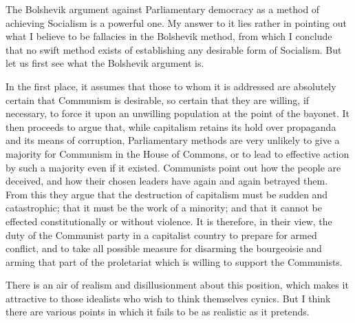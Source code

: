The Bolshevik argument against Parliamentary democracy as a method of achieving Socialism is a powerful one. My answer to it lies rather in pointing out what I believe to be fallacies in the Bolshevik method, from which I conclude that no swift method exists of establishing any desirable form of Socialism. But let us first see what the Bolshevik argument is.

In the first place, it assumes that those to whom it is addressed are absolutely certain that Communism is desirable, so certain that they are willing, if necessary, to force it upon an unwilling population at the point of the bayonet. It then proceeds to argue that, while capitalism retains its hold over propaganda and its means of corruption, Parliamentary methods are very unlikely to give a majority for Communism in the House of Commons, or to lead to effective action by such a majority even if it existed. Communists point out how the people are deceived, and how their chosen leaders have again and again betrayed them. From this they argue that the destruction of capitalism must be sudden and catastrophic; that it must be the work of a minority; and that it cannot be effected constitutionally or without violence. It is therefore, in their view, the duty of the Communist party in a capitalist country to prepare for armed conflict, and to take all possible measure for disarming the bourgeoisie and arming that part of the proletariat which is willing to support the Communists.

There is an air of realism and disillusionment about this position, which makes it attractive to those idealists who wish to think themselves cynics. But I think there are various points in which it fails to be as realistic as it pretends.

